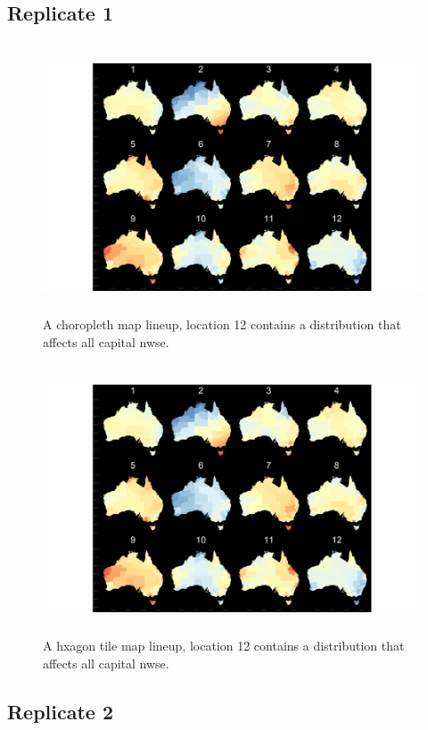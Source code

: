 \documentclass{monashthesis}
\begin{document}
\hypertarget{replicate-1-2}{%
\subsection{Replicate 1}\label{replicate-1-2}}

\begin{figure}[H]
\centering
\includegraphics[height=8cm]{lineups/nwse-geo2-1.pdf}
\caption{\label{fig:nwse-geo2}A choropleth map lineup, location 12 contains a distribution that affects all capital nwse.}
\end{figure}

\begin{figure}[H]
\centering
\includegraphics[height=8cm]{lineups/nwse-hex2-1.pdf}
\caption{\label{fig:nwse-hex2}A hxagon tile map lineup, location 12 contains a distribution that affects all capital nwse.}
\end{figure}

\hypertarget{replicate-2-2}{%
\subsection{Replicate 2}\label{replicate-2-2}}
\end{document}
